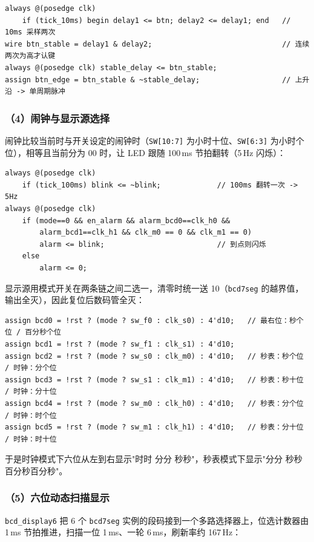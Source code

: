 \documentclass[12pt, a4paper]{ctexart}
\begin{document}
\begin{lstlisting}
always @(posedge clk)
    if (tick_10ms) begin delay1 <= btn; delay2 <= delay1; end   // 10ms 采样两次
wire btn_stable = delay1 & delay2;                              // 连续两次为高才认键
always @(posedge clk) stable_delay <= btn_stable;
assign btn_edge = btn_stable & ~stable_delay;                   // 上升沿 -> 单周期脉冲
\end{lstlisting}

\subsubsection*{（4）闹钟与显示源选择}
闹钟比较当前时与开关设定的闹钟时（\texttt{SW[10:7]} 为小时十位、\texttt{SW[6:3]} 为小时个位），相等且当前分为 00 时，让 LED 跟随 100\,ms 节拍翻转（5\,Hz 闪烁）：

\begin{lstlisting}
always @(posedge clk)
    if (tick_100ms) blink <= ~blink;             // 100ms 翻转一次 -> 5Hz
always @(posedge clk)
    if (mode==0 && en_alarm && alarm_bcd0==clk_h0 &&
        alarm_bcd1==clk_h1 && clk_m0 == 0 && clk_m1 == 0)
        alarm <= blink;                          // 到点则闪烁
    else
        alarm <= 0;
\end{lstlisting}

\noindent 显示源用模式开关在两条链之间二选一，清零时统一送 10（\texttt{bcd7seg} 的越界值，输出全灭），因此复位后数码管全灭：

\begin{lstlisting}
assign bcd0 = !rst ? (mode ? sw_f0 : clk_s0) : 4'd10;   // 最右位：秒个位 / 百分秒个位
assign bcd1 = !rst ? (mode ? sw_f1 : clk_s1) : 4'd10;
assign bcd2 = !rst ? (mode ? sw_s0 : clk_m0) : 4'd10;   // 秒表：秒个位  / 时钟：分个位
assign bcd3 = !rst ? (mode ? sw_s1 : clk_m1) : 4'd10;   // 秒表：秒十位  / 时钟：分十位
assign bcd4 = !rst ? (mode ? sw_m0 : clk_h0) : 4'd10;   // 秒表：分个位  / 时钟：时个位
assign bcd5 = !rst ? (mode ? sw_m1 : clk_h1) : 4'd10;   // 秒表：分十位  / 时钟：时十位
\end{lstlisting}

于是时钟模式下六位从左到右显示"时时 分分 秒秒"，秒表模式下显示"分分 秒秒 百分秒百分秒"。

\subsubsection*{（5）六位动态扫描显示}
\texttt{bcd\_display6} 把 6 个 \texttt{bcd7seg} 实例的段码接到一个多路选择器上，位选计数器由 1\,ms 节拍推进，扫描一位 1\,ms、一轮 6\,ms，刷新率约 167\,Hz：
\end{document}
